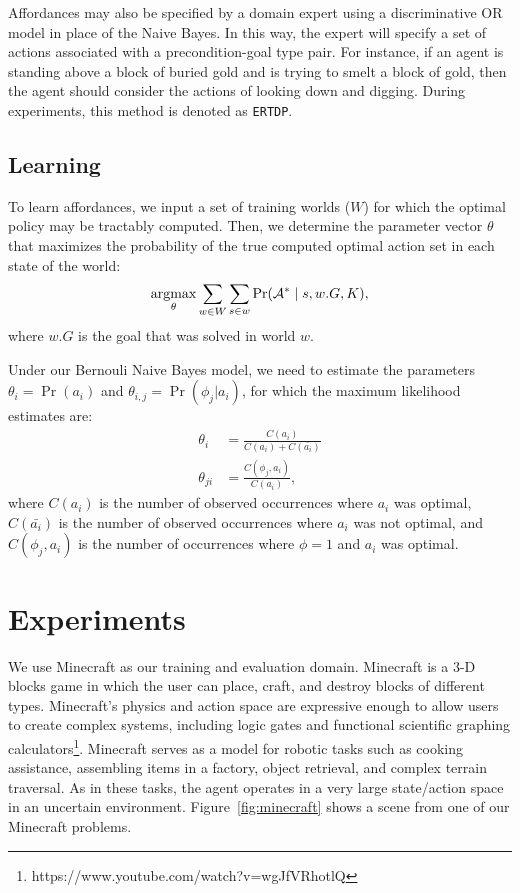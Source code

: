 \documentclass[conference]{IEEEtran}
\newcommand{\argmax}{\operatornamewithlimits{argmax}}
\begin{document}
Affordances may also be specified by a domain expert using a discriminative OR model in place of the Naive Bayes. In this way, the expert will specify a set of actions associated with a precondition-goal type pair. For instance, if an agent is standing above a block of buried gold and is trying to smelt a block of gold, then the agent should consider the actions of looking down and digging. During experiments, this method is denoted as \texttt{ERTDP}.


\subsection{Learning}

To learn affordances, we input a set of training worlds ($W$) for which the optimal policy may be tractably computed. Then, we determine the parameter vector $\theta$ that maximizes the probability of the true computed optimal action set in each state of the world:
\begin{equation}
\argmax_\theta \sum_{w \in W} \sum_{s \in w} \Pr(\mathcal{A}^* \mid s, w.G, K),
\end{equation}
where $w.G$ is the goal that was solved in world $w$.

Under our Bernouli Naive Bayes model, we need to estimate the parameters $\theta_i = \Pr(a_i)$ and $\theta_{i,j} = \Pr(\phi_j | a_i)$, for which the maximum likelihood estimates are:
\begin{align}
\theta_i &= \frac{C(a_i)}{C(a_i) + C(\bar{a_i})} \\
\theta_{ji} &= \frac{C(\phi_j, a_i)}{C(a_i)},
\end{align}
where $C(a_i)$ is the number of observed occurrences where $a_i$ was optimal, $C(\bar{a_i})$ is the number of observed occurrences where $a_i$ was not optimal, and $C(\phi_j, a_i)$ is the number of occurrences where $\phi=1$ and $a_i$ was optimal.

\section{Experiments}
\label{sec:experiments}

We use Minecraft as our training and evaluation domain. Minecraft is a
3-D blocks game in which the user can place, craft, and destroy blocks
of different types.  Minecraft's physics and action space are
expressive enough to allow users to create complex systems, including
logic gates and functional scientific graphing
calculators\footnote{https://www.youtube.com/watch?v=wgJfVRhotlQ}.
Minecraft serves as a model for robotic tasks such as cooking
assistance, assembling items in a factory, object retrieval, and
complex terrain traversal.  As in these tasks, the agent operates in a
very large state/action space in an uncertain environment.
Figure~\ref{fig:minecraft} shows a scene from one of our Minecraft
problems.
\end{document}
